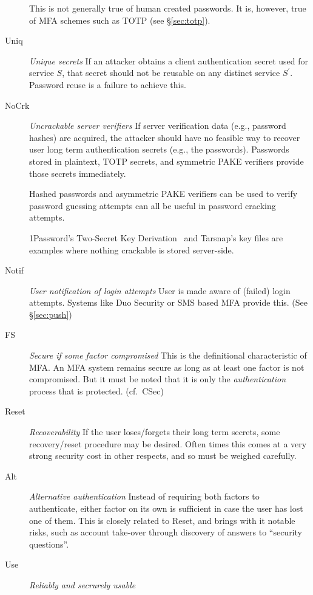 \documentclass{soups}
\newcommand{\propdescription}[1]{\textit{#1}\newline}
\newcommand{\prop}[1]{\textsf{#1}}
\begin{document}
\begin{description}
	This is not generally true of human created passwords.
    It is, however, true of MFA schemes such as TOTP (see \S\ref{sec:totp}).

  \item[Uniq] \propdescription{Unique secrets}
    If an attacker obtains a client authentication secret used for service $S$, 
    that secret should not be reusable on any distinct service $S^\prime$.
    Password reuse is a failure to achieve this. 

  \item[NoCrk] \propdescription{Uncrackable server verifiers}
   If server verification data (e.g., password hashes) are acquired,
   the attacker should have no feasible way to recover user long term authentication secrets (e.g., the passwords).
   Passwords stored in plaintext, TOTP secrets, and symmetric PAKE verifiers
   provide those secrets immediately.
   
   Hashed passwords and asymmetric PAKE verifiers can be used
   to verify password guessing attempts
   can all be useful in password cracking attempts.

   1Password's Two-Secret Key Derivation~\autocite{1Password:whitepaper}
   and Tarsnap's key files \autocite{mwlucas:tarsnap}
   are examples where nothing crackable is stored server-side.

  \item[Notif] \propdescription{User notification of login attempts}
    User is made aware of (failed) login attempts.
    Systems like Duo Security or SMS based MFA provide this.
    (See \S\ref{sec:push})

  \item[FS] \propdescription{Secure if some factor compromised}
    This is the definitional characteristic of MFA\@.
    An MFA system remains secure as long as at least one factor is not compromised.
    But it must be noted that it is only the \emph{authentication} process that is protected.
    (cf.~CSec)

  \item[Reset] \propdescription{Recoverability}
   If the user loses/forgets their long term secrets, some recovery/reset procedure may be desired. Often times this comes at a very strong security cost in other respects, and so must be weighed carefully.

  \item[Alt] \propdescription{Alternative authentication}
  Instead of requiring both factors to authenticate, either factor on its own is sufficient in case the user has lost one of them. This is closely related to  \prop{Reset}, and brings with it notable risks, such as account take-over through discovery of answers to “security questions”.

  \item[Use] \propdescription{Reliably and secrurely usable}
   
\end{description}
\end{document}
